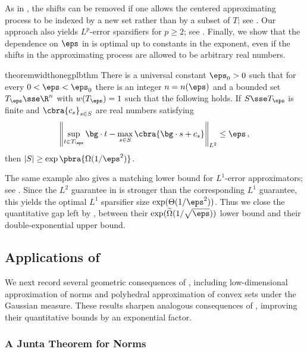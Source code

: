 \documentclass[11pt]{article}
\begin{document}
As in \cite{de2026sparsifying}, the shifts can be removed if one allows the centered approximating process to be indexed by a new set rather than by a subset of $T$; see . 
Our approach also yields $L^p$-error sparsifiers for $p \geq 2$; see . 
Finally, we show that the dependence on $\eps$ in  is optimal up to constants in the exponent, even if the shifts in the approximating process are allowed to be arbitrary real numbers. 

\begin{restatable}{theorem}{widthonegplbthm}
\label{thm:width-one-gp-lb}
	There is a universal constant $\eps_0>0$ such that for every
	$0<\eps<\eps_0$ there is an integer $n=n(\eps)$ and a bounded set
	$T_\eps\sse\R^n$ with $w(T_\eps)=1$ such that the following holds.  If
	$S\sse T_\eps$ is finite and $\cbra{c_s}_{s\in S}$ are real numbers satisfying
	\[
		\left\|
			\sup_{t\in T_\eps} \bg \cdot t
			-
			\max_{s\in S}\cbra{\bg\cdot s +c_s}
		\right\|_{L^2}
		\leq \eps\,,
	\]
	then $|S|\geq \exp\pbra{\Omega(1/\eps^2)}$.
\end{restatable}

The same example also gives a matching lower bound for $L^1$-error approximators; see .  
Since the $L^2$ guarantee in  is stronger than the corresponding $L^1$ guarantee, this yields the optimal $L^1$ sparsifier size $\exp(\Theta(1/\eps^2))$.  
Thus we close the quantitative gap left by \cite{de2026sparsifying}, between their $\exp(\widetilde\Omega(1/\sqrt\eps))$ lower bound and their double-exponential upper bound. 

\subsection{Applications of }
\label{subsec:apps}

We next record several geometric consequences of , including low-dimensional approximation of norms and polyhedral approximation of convex sets under the Gaussian measure. 
These results sharpen analogous consequences of \cite[Theorem~1]{de2026sparsifying}, improving their quantitative bounds by an exponential factor. 

\subsubsection{A Junta Theorem for Norms} 
\end{document}
